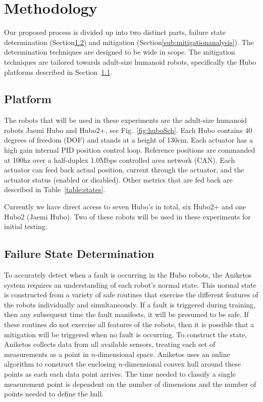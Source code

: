 \section{Methodology}
\label{sec:methodology}
Our proposed process is divided up into two distinct parts, failure state
determination (Section\ref{sub:FailureStateDetermination}) and mitigation
(Section\ref{sub:mitigationanalysis}).  The determination techniques are
designed to be wide in scope.  The mitigation techniques are tailored towards
adult-size humanoid robots, specifically the Hubo platforms described in
Section~\ref{sub:platform}.


\subsection{Platform}
\label{sub:platform}
The robots that will be used in these experiments are the adult-size humanoid
robots Jaemi Hubo and Hubo2+, see Fig.~\ref{fig:huboSch}.  Each Hubo contains
40 degrees of freedom (DOF) and stands at a height of 130cm.  Each actuator has
a high gain internal PID position control loop.  Reference positions are
commanded at 100hz over a half-duplex 1.0Mbps controlled area network (CAN).
Each actuator can feed back actual position, current through the actuator, and
the actuator status (enabled or disabled).  Other metrics that are fed back are
described in Table~\ref{table:states}.

Currently we have direct access to seven Hubo's in total, six Hubo2+ and one
Hubo2 (Jaemi Hubo).  Two of these robots will be used in these experiments for
initial testing.


\subsection{Failure State Determination}
\label{sub:FailureStateDetermination}
To accurately detect when a fault is occurring in the Hubo robots, the Aniketos
system requires an understanding of each robot's normal state. This normal
state is constructed from a variety of safe routines that exercise the
different features of the robots individually and simultaneously. If a fault is
triggered during training, then any subsequent time the fault manifests, it
will be presumed to be safe. If these routines do not exercise all features of
the robots, then it is possible that a mitigation will be triggered when no
fault is occurring. To construct the state, Aniketos collects data from all
available sensors, treating each set of measurements as a point in
$n$-dimensional space. Aniketos uses an online algorithm to construct the
enclosing $n$-dimensional convex hull around these points as each each data
point arrives. The time needed to classify a single measurement point is
dependent on the number of dimensions and the number of points needed to define
the hull.

